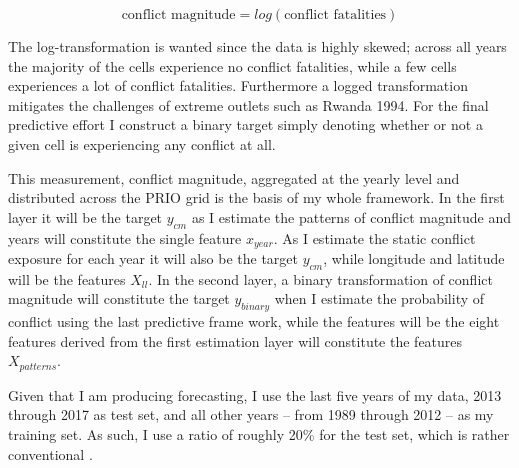 \documentclass[a4paper]{article}
\begin{document}
\[
\text{conflict magnitude} = log(\text{conflict fatalities}) \tag{18} \label{eq:cm}
\]

The log-transformation is wanted since the data is highly skewed; across all years the majority of the cells experience no conflict fatalities, while a few cells experiences a lot of conflict fatalities. Furthermore a logged transformation mitigates the challenges of extreme outlets such as Rwanda 1994. For the final predictive effort I construct a binary target simply denoting whether or not a given cell is experiencing any conflict at all.\par

This measurement, conflict magnitude, aggregated at the yearly level and distributed across the PRIO grid is the basis of my whole framework. In the first layer it will be the target $y_{cm}$ as I estimate the patterns of conflict magnitude and years will constitute the single feature $x_{year}$. As I estimate the static conflict exposure for each year it will also be the target $y_{cm}$, while longitude and latitude will be the features $X_{ll}$. In the second layer, a binary transformation of conflict magnitude will constitute the target $y_{binary}$ when I estimate the probability of conflict using the last predictive frame work, while the features will be the eight features derived from the first estimation layer will constitute the features $X_{patterns}$.\par

Given that I am producing forecasting, I use the last five years of my data, 2013 through 2017 as test set, and all other years -- from 1989 through 2012 -- as my training set. As such, I use a ratio of roughly 20\% for the test set, which is rather conventional \citep{Friedman_2001, Ward_Greenhill_Bakke_2010}.\par

\end{document}
